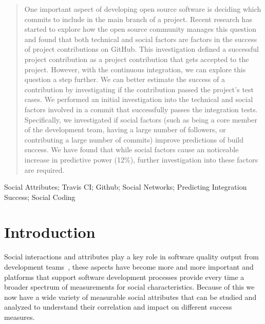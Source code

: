 \documentclass[10pt, conference]{IEEEtran}
\begin{document}




\maketitle


\begin{abstract}
One important aspect of developing open source software is deciding which
commits to include in the main branch of a project.  
Recent research has started to explore how the open source community manages
this question and found that both technical and social factors are factors in 
the success of project contributions on GitHub.  
This investigation defined a successful project contribution as a project
contribution that gets
accepted to the project.  However, with the continuous integration, we can
explore this question a step further.  We can better estimate the success of a
contribution by investigating if the contribution passed the project's
test cases.  We performed an initial investigation into the technical and
social factors involved in a commit that successfully passes the integration
tests. Specifically, we investigated if social factors (such as being a
core member of the development team, having a large number of followers,
or contributing a large number of commits) improve predictions of build
success.  We have found that while social factors cause an noticeable increase
in predictive power (12\%), further investigation into these factors are
required.
\end{abstract}

\begin{IEEEkeywords}
Social Attributes; Travis CI; Github; Social Networks; Predicting Integration 
Success; Social Coding
\end{IEEEkeywords}


%
\IEEEpeerreviewmaketitle



\section{Introduction}
Social interactions and attributes play a key role in software quality output 
from development teams~\cite{nagappan08,bettenburgh10}, these aspects have 
become more and more important and platforms that support software development 
processes provide every time a broader spectrum of measurements for social 
characteristics. Because of this we now have a wide variety of measurable social 
attributes that can be studied and analyzed to understand their correlation and 
impact on different success measures. 
\end{document}
